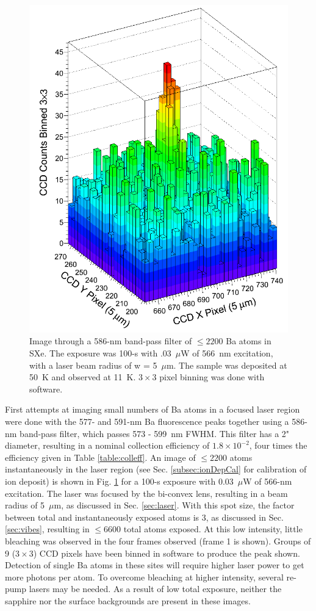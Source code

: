 \begin{figure} %
        \centering
                \includegraphics[width=.6\textwidth]{figures/image_1e4.png}
                \caption{Image through a 586-nm band-pass filter of $\leq 2200$ Ba atoms in SXe.  The exposure was 100-s with .03~$\mu$W of 566~nm excitation, with a laser beam radius of w = 5~$\mu$m.  The sample was deposited at 50~K and observed at 11~K.  $3 \times 3$ pixel binning was done with software.}
\label{fig:image590s}
\end{figure}

First attempts at imaging small numbers of Ba atoms in a focused laser region were done with the 577- and 591-nm Ba fluorescence peaks together using a 586-nm band-pass filter, which passes 573 - 599~nm FWHM.  This filter has a 2" diameter, resulting in a nominal collection efficiency of $1.8 \times 10^{-2}$, four times the efficiency given in Table \ref{table:colleff}.  An image of $\leq 2200$ atoms instantaneously in the laser region (see Sec. \ref{subsec:ionDepCal} for calibration of ion deposit) is shown in Fig. \ref{fig:image590s} for a 100-s exposure with 0.03~$\mu$W of 566-nm excitation.  The laser was focused by the bi-convex lens, resulting in a beam radius of 5~$\mu$m, as discussed in Sec. \ref{sec:laser}.  With this spot size, the factor between total and instantaneously exposed atoms is 3, as discussed in Sec. \ref{sec:vibes}, resulting in $\leq 6600$ total atoms exposed.  At this low intensity, little bleaching was observed in the four frames observed (frame 1 is shown).  Groups of 9 ($3 \times 3$) CCD pixels have been binned in software to produce the peak shown.  Detection of single Ba atoms in these sites will require higher laser power to get more photons per atom.  To overcome bleaching at higher intensity, several re-pump lasers may be needed.  As a result of low total exposure, neither the sapphire nor the surface backgrounds are present in these images. 

